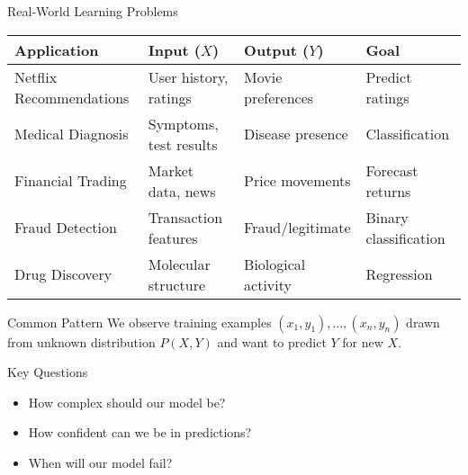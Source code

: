 \documentclass[aspectratio=169,11pt]{beamer}
\begin{document}
\begin{frame}{Real-World Learning Problems}
\begin{table}
\centering
\small
\begin{tabular}{p{3cm}p{3.5cm}p{3cm}p{2cm}}
\toprule
\textbf{Application} & \textbf{Input ($X$)} & \textbf{Output ($Y$)} & \textbf{Goal} \\
\midrule
Netflix Recommendations & User history, ratings & Movie preferences & Predict ratings \\
\midrule
Medical Diagnosis & Symptoms, test results & Disease presence & Classification \\
\midrule
Financial Trading & Market data, news & Price movements & Forecast returns \\
\midrule
Fraud Detection & Transaction features & Fraud/legitimate & Binary classification \\
\midrule
Drug Discovery & Molecular structure & Biological activity & Regression \\
\bottomrule
\end{tabular}
\end{table}

\vspace{0.3cm}
\begin{block}{Common Pattern}
We observe training examples $(x_1, y_1), \ldots, (x_n, y_n)$ drawn from unknown distribution $P(X,Y)$ and want to predict $Y$ for new $X$.
\end{block}

\begin{alertblock}{Key Questions}
\begin{itemize}
\item How complex should our model be?
\item How confident can we be in predictions?
\item When will our model fail?
\end{itemize}
\end{alertblock}
\end{frame}
\end{document}
